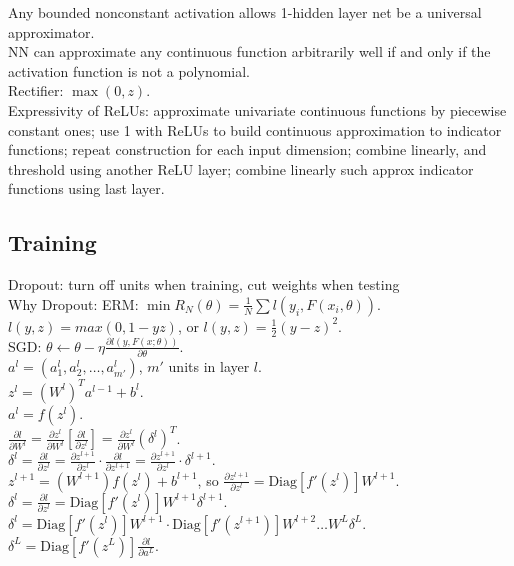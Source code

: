 Any bounded nonconstant activation allows 1-hidden layer net be a universal approximator.\\
NN can approximate any continuous function arbitrarily well if and only if the activation function is not a polynomial.\\
Rectifier: $\max(0, z)$.\\
Expressivity of ReLUs: approximate univariate continuous functions by piecewise constant ones; use 1 with ReLUs to build continuous approximation to indicator functions; repeat construction for each input dimension; combine linearly, and threshold using another ReLU layer; combine linearly such approx indicator functions using last layer.

\subsection*{Training}

Dropout: turn off units when training, cut weights when testing\\
Why Dropout: 
ERM: $\min R_N(\theta) = \frac{1}{N}\sum l(y_i, F(x_i, \theta))$.\\
$l(y, z) = max(0, 1-yz)$, or $l(y, z) = \frac{1}{2}(y-z)^2$.\\
SGD: $\theta \leftarrow \theta - \eta \frac{\partial l(y, F(x; \theta))}{\partial \theta}$.\\
$a^l = (a_1^l, a_2^l, \dots, a_{m'}^l)$, $m'$ units in layer $l$.\\
$z^l = (W^l)^T a^{l-1} + b^l$.\\
$a^l = f(z^l)$.\\
$\frac{\partial l}{\partial W^l} = \frac{\partial z^l}{\partial W^l}[\frac{\partial l}{\partial z^l}] = \frac{\partial z^l}{\partial W^l}(\delta^l)^T$.\\
$\delta^l = \frac{\partial l}{\partial z^l} = \frac{\partial z^{l+1}}{\partial z^l}\cdot\frac{\partial l}{\partial z^{l+1}} = \frac{\partial z^{l+1}}{\partial z^l} \cdot \delta^{l+1}$.\\
$z^{l+1} = (W^{l+1})f(z^l) + b^{l+1}$, so $\frac{\partial z^{l+1}}{\partial z^l} = \text{Diag}[f'(z^l)]W^{l+1}$.\\
$\delta^l = \frac{\partial l}{\partial z^l} = \text{Diag}[f'(z^l)]W^{l+1}\delta^{l+1}.$\\
$\delta^l = \text{Diag}[f'(z^l)]W^{l+1}\cdot\text{Diag}[f'(z^{l+1})]W^{l+2} \dots W^{L}\delta^L$.\\
$\delta^L = \text{Diag}[f'(z^L)]\frac{\partial l}{\partial a^L}$.\\


